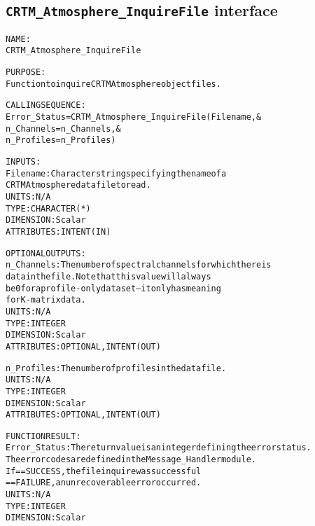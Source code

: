 \subsection{\texttt{CRTM\_Atmosphere\_InquireFile} interface}
  \label{sec:CRTM_Atmosphere_InquireFile_interface}
  \begin{alltt}
 
  NAME:
        CRTM_Atmosphere_InquireFile
 
  PURPOSE:
        Function to inquire CRTM Atmosphere object files.
 
  CALLING SEQUENCE:
        Error_Status = CRTM_Atmosphere_InquireFile( Filename               , &
                                                    n_Channels = n_Channels, &
                                                    n_Profiles = n_Profiles  )
 
  INPUTS:
        Filename:       Character string specifying the name of a
                        CRTM Atmosphere data file to read.
                        UNITS:      N/A
                        TYPE:       CHARACTER(*)
                        DIMENSION:  Scalar
                        ATTRIBUTES: INTENT(IN)
 
  OPTIONAL OUTPUTS:
        n_Channels:     The number of spectral channels for which there is
                        data in the file. Note that this value will always
                        be 0 for a profile-only dataset-- it only has meaning
                        for K-matrix data.
                        UNITS:      N/A
                        TYPE:       INTEGER
                        DIMENSION:  Scalar
                        ATTRIBUTES: OPTIONAL, INTENT(OUT)
 
        n_Profiles:     The number of profiles in the data file.
                        UNITS:      N/A
                        TYPE:       INTEGER
                        DIMENSION:  Scalar
                        ATTRIBUTES: OPTIONAL, INTENT(OUT)
 
  FUNCTION RESULT:
        Error_Status:   The return value is an integer defining the error status.
                        The error codes are defined in the Message_Handler module.
                        If == SUCCESS, the file inquire was successful
                           == FAILURE, an unrecoverable error occurred.
                        UNITS:      N/A
                        TYPE:       INTEGER
                        DIMENSION:  Scalar
 
  \end{alltt}
